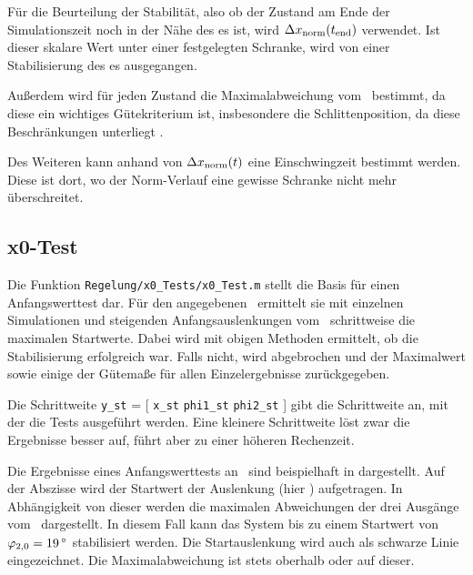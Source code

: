 Für die Beurteilung der Stabilität, also ob der Zustand am Ende der Simulationszeit noch in der Nähe des \ap es ist, wird
$\Delta x_{\mathrm{norm}}(t_{\mathrm{end}})$
verwendet. Ist dieser skalare Wert unter einer festgelegten Schranke, wird von einer Stabilisierung des \ap es ausgegangen.

Außerdem wird für jeden Zustand die Maximalabweichung vom \ap\ bestimmt, da diese ein wichtiges Gütekriterium ist, insbesondere die Schlittenposition, da diese Beschränkungen unterliegt .

Des Weiteren kann anhand von $\Delta x_{\mathrm{norm}}(t)$ eine Einschwingzeit bestimmt werden.
Diese ist dort, wo der Norm-Verlauf eine gewisse Schranke nicht mehr überschreitet.


\subsection{x0-Test}

Die Funktion \texttt{Regelung/x0\_Tests/x0\_Test.m} stellt die Basis für einen Anfangswerttest dar.
Für den angegebenen \ap\ ermittelt sie mit einzelnen Simulationen und steigenden Anfangsauslenkungen vom \ap\ schrittweise die maximalen Startwerte.
Dabei wird mit obigen Methoden ermittelt, ob die Stabilisierung erfolgreich war.
Falls nicht, wird abgebrochen und der Maximalwert sowie einige der Gütemaße für allen Einzelergebnisse zurückgegeben.

Die Schrittweite \texttt{y\_st} = [ \texttt{x\_st} \texttt{phi1\_st} \texttt{phi2\_st} ] gibt die Schrittweite an, mit der die Tests ausgeführt werden.
Eine kleinere Schrittweite löst zwar die Ergebnisse besser auf, führt aber zu einer höheren Rechenzeit.

Die Ergebnisse eines Anfangswerttests an \apv\ sind beispielhaft in  dargestellt.
Auf der Abszisse wird der Startwert der Auslenkung (hier \phz) aufgetragen.
In Abhängigkeit von dieser werden die maximalen Abweichungen der drei Ausgänge vom \ap\ dargestellt.
In diesem Fall kann das System bis zu einem Startwert von $\phzo=\valdeg{19}$ stabilisiert werden.
Die Startauslenkung wird auch als schwarze Linie eingezeichnet. 
Die Maximalabweichung ist stets oberhalb oder auf dieser.

